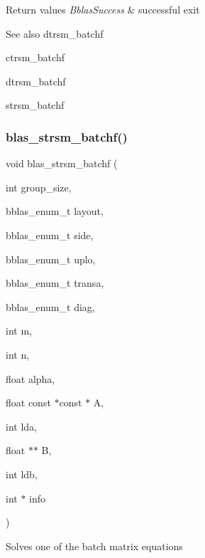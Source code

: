 \begin{DoxyRetVals}{Return values}
{\em Bblas\+Success} & successful exit\\
\hline
\end{DoxyRetVals}
\begin{DoxySeeAlso}{See also}
dtrsm\+\_\+batchf 

ctrsm\+\_\+batchf 

dtrsm\+\_\+batchf 

strsm\+\_\+batchf 
\end{DoxySeeAlso}
\mbox{\label{group__trsm__batchf_ga3a305094ed72cc68fa60e4a749f56e1f}} 
\subsubsection{\texorpdfstring{blas\+\_\+strsm\+\_\+batchf()}{blas\_strsm\_batchf()}}
{\footnotesize\ttfamily void blas\+\_\+strsm\+\_\+batchf (\begin{DoxyParamCaption}\item[{int}]{group\+\_\+size,  }\item[{bblas\+\_\+enum\+\_\+t}]{layout,  }\item[{bblas\+\_\+enum\+\_\+t}]{side,  }\item[{bblas\+\_\+enum\+\_\+t}]{uplo,  }\item[{bblas\+\_\+enum\+\_\+t}]{transa,  }\item[{bblas\+\_\+enum\+\_\+t}]{diag,  }\item[{int}]{m,  }\item[{int}]{n,  }\item[{float}]{alpha,  }\item[{float const $\ast$const $\ast$}]{A,  }\item[{int}]{lda,  }\item[{float $\ast$$\ast$}]{B,  }\item[{int}]{ldb,  }\item[{int $\ast$}]{info }\end{DoxyParamCaption})}

Solves one of the batch matrix equations

